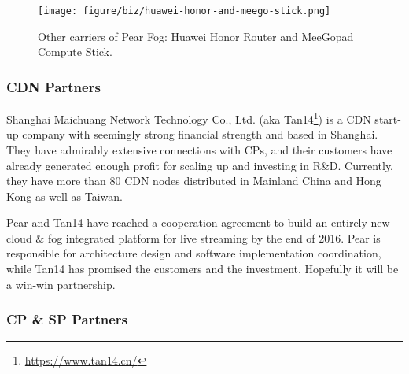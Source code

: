 \begin{itemize}
	\begin{figure}[ht]
		\centering
		\texttt{[image: figure/biz/huawei-honor-and-meego-stick.png]}
		\caption{Other carriers of Pear Fog: Huawei Honor Router and MeeGopad Compute Stick.} \label{fig:huawei-honor-and-meego-stick}
	\end{figure}
\end{itemize}

\subsubsection{CDN Partners}
Shanghai Maichuang Network Technology Co., Ltd. (aka Tan14\footnote{\url{https://www.tan14.cn/}}) is a CDN start-up company with seemingly strong financial strength and based in Shanghai. They have admirably extensive connections with CPs, and their customers have already generated enough profit for scaling up and investing in R\&D. Currently, they have more than 80 CDN nodes distributed in Mainland China and Hong Kong as well as Taiwan.

Pear and Tan14 have reached a cooperation agreement to build an entirely new cloud \& fog integrated platform for live streaming by the end of 2016. Pear is responsible for architecture design and software implementation coordination, while Tan14 has promised the customers and the investment. Hopefully it will be a win-win partnership.

\subsubsection{CP \& SP Partners}

